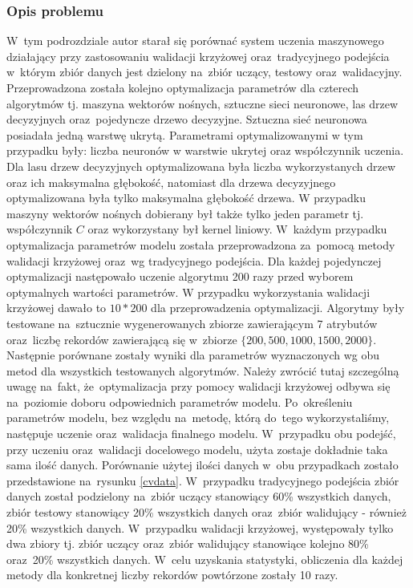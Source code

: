 \subsubsection{Opis problemu}
W~tym podrozdziale autor starał się porównać system uczenia maszynowego działający przy zastosowaniu walidacji krzyżowej oraz~tradycyjnego podejścia w~którym zbiór danych jest dzielony na~zbiór uczący, testowy oraz~walidacyjny. Przeprowadzona została kolejno optymalizacja parametrów dla czterech algorytmów tj. maszyna wektorów nośnych, sztuczne sieci neuronowe, las drzew decyzyjnych oraz~pojedyncze drzewo decyzyjne. Sztuczna sieć neuronowa posiadała jedną warstwę ukrytą. Parametrami optymalizowanymi w tym przypadku były: liczba neuronów w warstwie ukrytej oraz współczynnik uczenia. Dla lasu drzew decyzyjnych optymalizowana była liczba wykorzystanych drzew oraz ich maksymalna głębokość, natomiast dla drzewa decyzyjnego optymalizowana była tylko maksymalna głębokość drzewa. W przypadku maszyny wektorów nośnych dobierany był także tylko jeden parametr tj. współczynnik $C$ oraz wykorzystany był kernel liniowy. W~każdym przypadku optymalizacja parametrów modelu została przeprowadzona za~pomocą metody walidacji krzyżowej oraz~wg tradycyjnego podejścia. Dla każdej pojedynczej optymalizacji następowało uczenie algorytmu 200 razy przed wyborem optymalnych wartości parametrów. W przypadku wykorzystania walidacji krzyżowej dawało to $10*200$ dla przeprowadzenia optymalizacji. Algorytmy były testowane na~sztucznie wygenerowanych zbiorze zawierającym 7 atrybutów oraz~liczbę rekordów zawierającą się w~zbiorze $ \{200, 500, 1000, 1500, 2000\}.$ Następnie porównane zostały wyniki dla parametrów wyznaczonych wg obu metod dla wszystkich testowanych algorytmów. Należy zwrócić tutaj szczególną uwagę na~fakt, że~optymalizacja przy pomocy walidacji krzyżowej odbywa się na~poziomie doboru odpowiednich parametrów modelu. Po~określeniu parametrów modelu, bez względu na~metodę, którą do~tego wykorzystaliśmy, następuje uczenie oraz~walidacja finalnego modelu. W~przypadku obu podejść, przy uczeniu oraz~walidacji docelowego modelu, użyta zostaje dokładnie taka sama ilość danych. Porównanie użytej ilości danych w~obu przypadkach zostało przedstawione na~rysunku \ref{cvdata}. W~przypadku tradycyjnego podejścia zbiór danych został podzielony na~zbiór uczący stanowiący 60\% wszystkich danych, zbiór testowy stanowiący 20\% wszystkich danych oraz~zbiór walidujący - również 20\% wszystkich danych. W~przypadku walidacji krzyżowej, występowały tylko dwa zbiory tj. zbiór uczący oraz~zbiór walidujący stanowiące kolejno 80\% oraz~20\% wszystkich danych. W~celu uzyskania statystyki, obliczenia dla każdej metody dla konkretnej liczby rekordów powtórzone zostały 10 razy.

